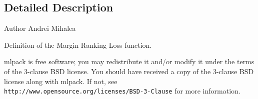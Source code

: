 \subsection{Detailed Description}
\begin{DoxyAuthor}{Author}
Andrei Mihalea
\end{DoxyAuthor}
Definition of the Margin Ranking Loss function.

mlpack is free software; you may redistribute it and/or modify it under the terms of the 3-\/clause B\+SD license. You should have received a copy of the 3-\/clause B\+SD license along with mlpack. If not, see {\tt http\+://www.\+opensource.\+org/licenses/\+B\+S\+D-\/3-\/\+Clause} for more information. 